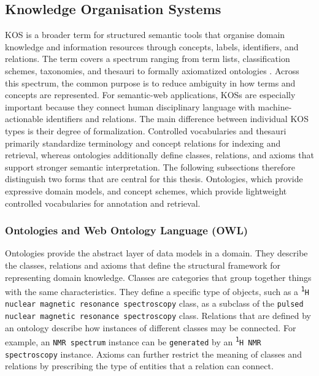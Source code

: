 \subsection{Knowledge Organisation Systems}
\label{sec:knowledge-organisation-systems}

\ac{KOS} is a broader term for structured semantic tools that organise domain knowledge and information resources through concepts, labels, identifiers, and relations.
The term covers a spectrum ranging from term lists, classification schemes, taxonomies, and thesauri to formally axiomatized ontologies \cite{mazzocchi2018kos,niso2005z3919}.
Across this spectrum, the common purpose is to reduce ambiguity in how terms and concepts are represented.
For semantic-web applications, \acp{KOS} are especially important because they connect human disciplinary language with machine-actionable identifiers and relations.
The main difference between individual \ac{KOS} types is their degree of formalization.
Controlled vocabularies and thesauri primarily standardize terminology and concept relations for indexing and retrieval, whereas ontologies additionally define classes, relations, and axioms that support stronger semantic interpretation.
The following subsections therefore distinguish two forms that are central for this thesis.
Ontologies, which provide expressive domain models, and concept schemes, which provide lightweight controlled vocabularies for annotation and retrieval.

\subsubsection{Ontologies and Web Ontology Language (OWL)}
Ontologies provide the abstract layer of data models in a domain.
They describe the classes, relations and axioms that define the structural framework for representing domain knowledge.
Classes are categories that group together things with the same characteristics.
They define a specific type of objects, such as a \texttt{\textsuperscript{1}H nuclear magnetic resonance spectroscopy} class, as a subclass of the \texttt{pulsed nuclear magnetic resonance spectroscopy} class.  
Relations that are defined by an ontology describe how instances of different classes may be connected.
For example, an \texttt{NMR spectrum} instance can be \texttt{generated} by an \texttt{\textsuperscript{1}H NMR spectroscopy} instance.
Axioms can further restrict the meaning of classes and relations by prescribing the type of entities that a relation can connect.

